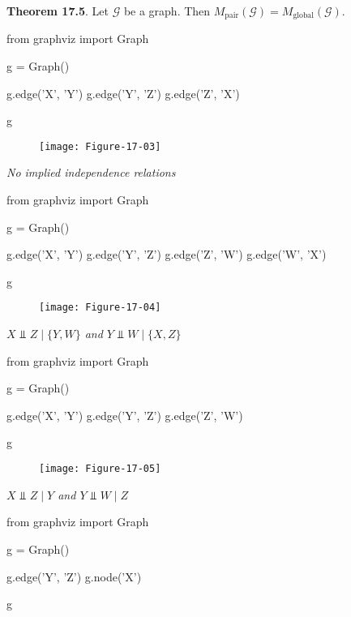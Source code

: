 \textbf{Theorem 17.5}. Let \(\mathcal{G}\) be a graph. Then
\(M_\text{pair}(\mathcal{G}) = M_\text{global}(\mathcal{G})\).

\begin{python}
from graphviz import Graph

g = Graph()

g.edge('X', 'Y')
g.edge('Y', 'Z')
g.edge('Z', 'X')

g
\end{python}
 
\begin{figure}[H]
\texttt{[image: Figure-17-03]}
\end{figure}

\emph{No implied independence relations}

\begin{python}
from graphviz import Graph

g = Graph()

g.edge('X', 'Y')
g.edge('Y', 'Z')
g.edge('Z', 'W')
g.edge('W', 'X')

g
\end{python}
 
\begin{figure}[H]
\texttt{[image: Figure-17-04]}
\end{figure}

\emph{\(X \text{ ⫫ } Z \;|\; \{Y, W\}\) and
\(Y \text{ ⫫ } W \;|\; \{X, Z\}\)}

\begin{python}
from graphviz import Graph

g = Graph()

g.edge('X', 'Y')
g.edge('Y', 'Z')
g.edge('Z', 'W')

g
\end{python}
 
\begin{figure}[H]
\texttt{[image: Figure-17-05]}
\end{figure}

\emph{\(X \text{ ⫫ } Z \;|\; Y\) and \(Y \text{ ⫫ } W \;|\; Z\)}

\begin{python}
from graphviz import Graph

g = Graph()

g.edge('Y', 'Z')
g.node('X')

g
\end{python}

